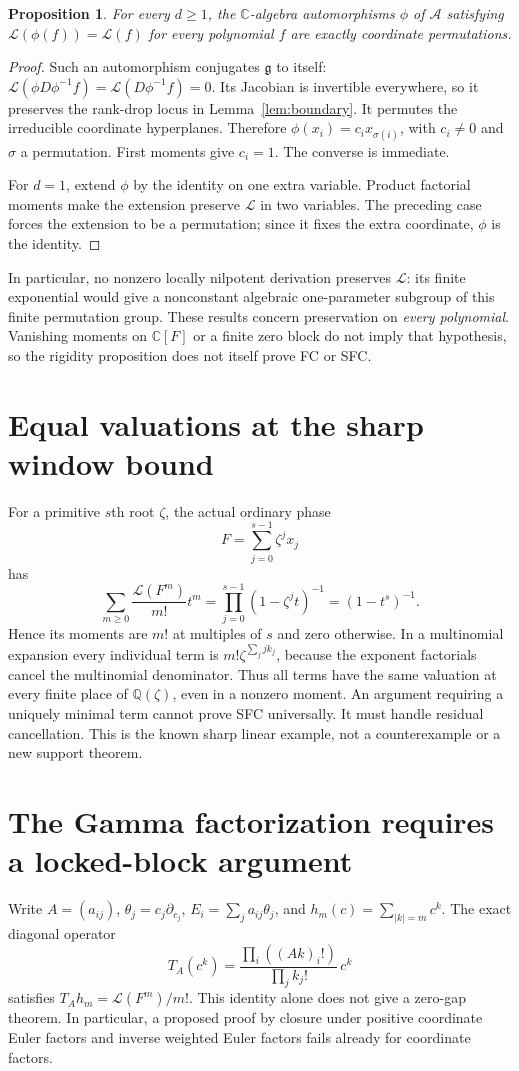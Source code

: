 \documentclass[11pt]{article}
\newtheorem{proposition}{Proposition}
\newcommand{\Lfac}{\mathcal L}
\newcommand{\C}{\mathbb C}
\newcommand{\A}{\mathcal A}
\begin{document}
\begin{proposition}\label{prop:automorphisms}
For every $d\geq1$, the $\C$-algebra automorphisms $\phi$ of $\A$
satisfying $\Lfac(\phi(f))=\Lfac(f)$ for every polynomial $f$ are
exactly coordinate permutations.
\end{proposition}
\begin{proof}
Such an automorphism conjugates $\mathfrak g$ to itself:
$\Lfac(\phi D\phi^{-1}f)=\Lfac(D\phi^{-1}f)=0$.
Its Jacobian is invertible everywhere, so it preserves the rank-drop
locus in Lemma~\ref{lem:boundary}. It permutes the irreducible coordinate
hyperplanes. Therefore
$\phi(x_i)=c_ix_{\sigma(i)}$, with $c_i\ne0$ and $\sigma$ a permutation.
First moments give $c_i=1$. The converse is immediate.

For $d=1$, extend $\phi$ by the identity on one extra variable.
Product factorial moments make the extension preserve $\Lfac$ in two
variables. The preceding case forces the extension to be a permutation;
since it fixes the extra coordinate, $\phi$ is the identity.
\end{proof}

In particular, no nonzero locally nilpotent derivation preserves
$\Lfac$: its finite exponential would give a nonconstant algebraic
one-parameter subgroup of this finite permutation group.
These results concern preservation on \emph{every polynomial}.
Vanishing moments on $\C[F]$ or a finite zero block do not imply that
hypothesis, so the rigidity proposition does not itself prove FC or SFC.

\section{Equal valuations at the sharp window bound}
For a primitive $s$th root $\zeta$, the actual ordinary phase
\[
 F=\sum_{j=0}^{s-1}\zeta^jx_j
\]
has
\[
 \sum_{m\geq0}\frac{\Lfac(F^m)}{m!}t^m
 =\prod_{j=0}^{s-1}(1-\zeta^jt)^{-1}=(1-t^s)^{-1}.
\]
Hence its moments are $m!$ at multiples of $s$ and zero otherwise.
In a multinomial expansion every individual term is
$m!\zeta^{\sum_jjk_j}$, because the exponent factorials cancel the
multinomial denominator. Thus all terms have the same valuation
at every finite place of $\mathbb Q(\zeta)$, even in a nonzero moment.
An argument requiring a uniquely minimal term cannot prove SFC
universally. It must handle residual cancellation. This is the known
sharp linear example, not a counterexample or a new support theorem.


\section{The Gamma factorization requires a locked-block argument}
Write $A=(a_{ij})$, $\theta_j=c_j\partial_{c_j}$,
$E_i=\sum_j a_{ij}\theta_j$, and
$h_m(c)=\sum_{|k|=m}c^k$.  The exact diagonal operator
\[
 T_A(c^k)=\frac{\prod_i((Ak)_i!)}{\prod_j k_j!}\,c^k
\]
satisfies $T_Ah_m=\Lfac(F^m)/m!$.  This identity alone does not
give a zero-gap theorem.  In particular, a proposed proof by closure
under positive coordinate Euler factors and inverse weighted Euler
factors fails already for coordinate factors.
\end{document}
